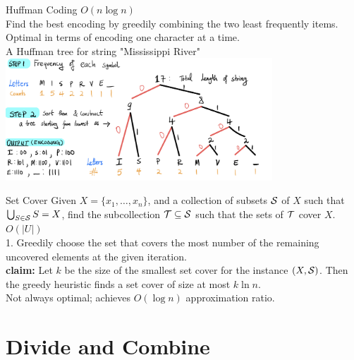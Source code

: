 \documentclass[10pt,a4paper]{article}
\begin{document}
\begin{multicols}{3}
    \begin{textbox}{Huffman Coding}
          $O(n\log n)$ \\
        Find the best encoding by greedily combining the two least frequently items. Optimal in terms of encoding one character at a time.\\
        \linebreak
         A Huffman tree for string  "Mississippi River"\\
        \includegraphics[width=0.75\textwidth]{images/Huffman-coding.jpeg}
    \end{textbox}

    \begin{textbox}{Set Cover}
        Given $X = \{x_1,\ldots,x_n\}$, and a collection of subsets $\cal{S}$ of $X$ such
        that $\bigcup_{S \in \cal{S}} S = X$, find the subcollection $\cal{T} \subseteq \cal{S}$ such that the sets of
        $\cal{T}$ cover $X$.\\
        \linebreak
          $O(|U|)$ \\
        1. Greedily choose the set that covers the most number of the remaining uncovered elements at the given iteration.\\
        {\bf claim:} Let $k$ be the size of the smallest set cover for
        the instance $(X,\cal{S})$.  Then the greedy heuristic finds
        a set cover of size at most $k \ln n$.
        \linebreak
        \\Not always optimal; achieves $O(\log n)$ approximation ratio.
    \end{textbox}

    \section{Divide and Combine}


\end{multicols}
\end{document}
